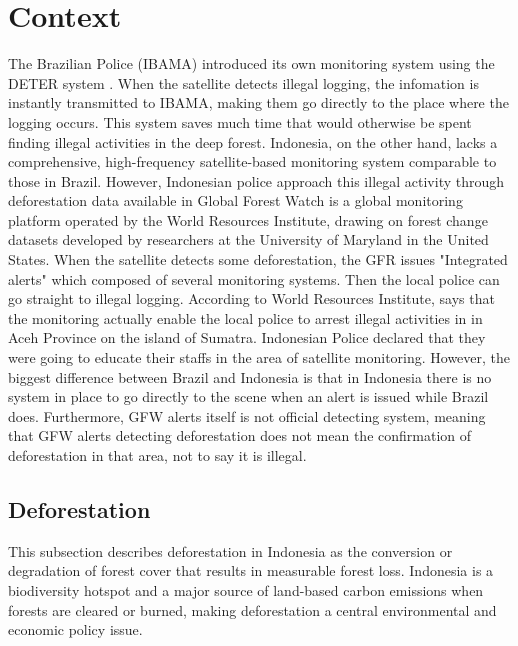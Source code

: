 \documentclass[hidelinks,12pt]{article}
\begin{document}



\section{Context} \label{sec:model}

The Brazilian Police (IBAMA) introduced its own monitoring system using the DETER system \citep{assuncao2023detering}. When the satellite detects illegal logging, the infomation is instantly transmitted to IBAMA, making them go directly to the place where the logging occurs. This system saves much time that would otherwise be spent finding illegal activities in the deep forest.
Indonesia, on the other hand, lacks a comprehensive, high-frequency satellite-based monitoring system comparable to those in Brazil. However, Indonesian police approach this illegal activity through deforestation data available in Global Forest Watch is a global monitoring platform operated by the World Resources Institute, drawing on forest change datasets developed by researchers at the University of Maryland in the United States. When the satellite detects some deforestation, the GFR issues "Integrated alerts" which composed of several monitoring systems. Then the local police can go straight to illegal logging. According to World Resources Institute, \citet{bourgault2018global} says that the monitoring actually enable the local police to arrest illegal activities in in Aceh Province on the island of Sumatra. Indonesian Police declared that they were going to educate their staffs in the area of satellite monitoring.
However, the biggest difference between Brazil and Indonesia is that in Indonesia there is no system in place to go directly to the scene when an alert is issued while Brazil does. 
Furthermore, GFW alerts itself is not official detecting system, meaning that GFW alerts detecting deforestation does not mean the confirmation of deforestation in that area, not to say it is illegal.



\subsection{Deforestation} \label{subsec:environment}
This subsection describes deforestation in Indonesia as the conversion or degradation of forest cover that results in measurable forest loss. Indonesia is a biodiversity hotspot and a major source of land-based carbon emissions when forests are cleared or burned, making deforestation a central environmental and economic policy issue.
\end{document}

